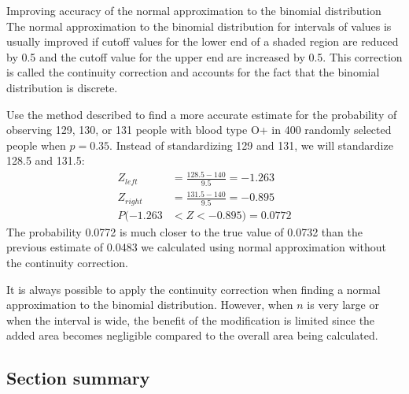\begin{onebox}{Improving accuracy of the normal approximation to the binomial distribution}
The normal approximation to the binomial distribution for intervals of values is usually improved if cutoff values for the lower end of a shaded region are reduced by 0.5 and the cutoff value for the upper end are increased by 0.5. This correction is called the continuity correction and accounts for the fact that the binomial distribution is discrete.\end{onebox}

\begin{examplewrap}
\begin{nexample}{Use the method described to find a more accurate estimate for the probability of observing 129, 130, or 131 people with blood type O+ in 400 randomly selected people when $p=0.35$.}
Instead of standardizing 129 and 131, we will standardize 128.5 and 131.5:
\begin{align*}
Z_{left} &= \frac{128.5-140}{9.5} = -1.263 \\
Z_{right} &= \frac{131.5-140}{9.5} = -0.895 \\
P(-1.263 &< Z < -0.895) = 0.0772
\end{align*}
The probability 0.0772 is much closer to the true value of 0.0732 than the previous estimate of 0.0483 we calculated using normal approximation without the continuity correction.
\end{nexample}
\end{examplewrap}

It is always possible to apply the continuity correction when finding a normal approximation to the binomial distribution. However, when $n$ is very large or when the interval is wide, the benefit of the modification is limited since the added area becomes negligible compared to the overall area being calculated.



\B{\newpage}

\subsection*{Section summary}

